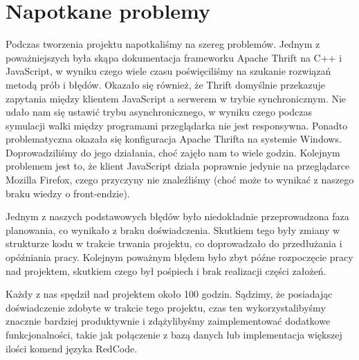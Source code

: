 \chapter{Napotkane problemy}
Podczas tworzenia projektu napotkaliśmy na szereg problemów. Jednym z poważniejszych była skąpa dokumentacja frameworku Apache Thrift na C++ i JavaScript, w wyniku czego wiele czasu poświęciliśmy na szukanie rozwiązań metodą prób i błędów. Okazało się również, że Thrift domyślnie przekazuje zapytania między klientem JavaScript a serwerem w trybie synchronicznym. Nie udało nam się ustawić trybu asynchronicznego, w wyniku czego podczas symulacji walki między programami przeglądarka nie jest responsywna. Ponadto problematyczna okazała się konfiguracja Apache Thrifta na systemie Windows. Doprowadziliśmy do jego działania, choć zajęło nam to wiele godzin. Kolejnym problemem jest to, że klient JavaScript działa poprawnie jedynie na przeglądarce Mozilla Firefox, czego przyczyny nie znaleźliśmy (choć może to wynikać z naszego braku wiedzy o front-endzie). 

Jednym z naszych podstawowych błędów było niedokładnie przeprowadzona faza planowania, co wynikało z braku doświadczenia. Skutkiem tego były zmiany w strukturze kodu w trakcie trwania projektu, co doprowadzało do przedłużania i opóźniania pracy. Kolejnym poważnym błędem było zbyt późne rozpoczęcie pracy nad projektem, skutkiem czego był pośpiech i brak realizacji części założeń.

Każdy z nas spędził nad projektem około 100 godzin. Sądzimy, że posiadając doświadczenie zdobyte w trakcie tego projektu, czas ten wykorzystalibyśmy znacznie bardziej produktywnie i zdążylibyśmy zaimplementować dodatkowe funkcjonalności, takie jak połączenie z bazą danych lub implementacja większej ilości komend języka RedCode.
